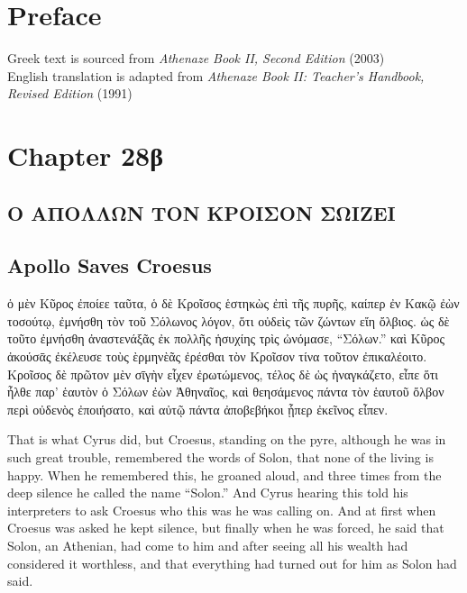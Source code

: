 \documentclass{article}
\begin{document}
\section{Preface}

Greek text is sourced from \emph{Athenaze Book II, Second Edition} (2003) \\
English translation is adapted from \emph{Athenaze Book II: Teacher's Handbook, Revised Edition} (1991)

\section{Chapter 28\textgreek{β}}

\subsection*{\textgreek{Ο ΑΠΟΛΛΩΝ ΤΟΝ ΚΡΟΙΣΟΝ ΣΩΙΖΕΙ}}
\subsection*{Apollo Saves Croesus}

\begin{greek}
ὁ μὲν Κῦρος ἐποίεε ταῦτα, ὁ δὲ Κροῖσος ἑστηκὼς ἐπὶ τῆς πυρῆς,
καίπερ ἐν Κακῷ ἐὼν τοσούτῳ, ἐμνήσθη τὸν τοῦ Σόλωνος λόγον,
ὅτι οὐδεὶς τῶν ζώντων εἴη ὄλβιος.
ὡς δὲ τοῦτο ἐμνήσθη ἀναστενάξᾶς ἐκ πολλῆς ἡσυχίης τρὶς ὠνόμασε, “Σόλων.”
καὶ Κῦρος ἀκούσᾱς ἐκέλευσε τοὺς ὲρμηνὲᾶς ἐρέσθαι τὸν Κροῖσον τίνα τοῦτον ἐπικαλέοιτο.
Κροῖσος δὲ πρῶτον μὲν σῑγὴν εἶχεν ἐρωτώμενος, τέλος δὲ ὡς ἠναγκάζετο,
εἶπε ὅτι ἦλθε παρ’ ἑαυτὸν ὁ Σόλων ἐὼν Ἀθηναῖος,
καὶ θεησάμενος πάντα τὸν ἑαυτοῦ ὄλβον περὶ οὐδενὸς ἐποιήσατο,
καὶ αὐτῷ πάντα ἀποβεβήκοι ᾗπερ ἐκεῖνος εἶπεν. \\
\end{greek}


That is what Cyrus did, but Croesus, standing on the pyre,
although he was in such great trouble, remembered the words of Solon,
that none of the living is happy.
When he remembered this, he groaned aloud,
and three times from the deep silence he called the name ``Solon.''
And Cyrus hearing this told his interpreters to ask Croesus who this was he was calling on.
And at first when Croesus was asked he kept silence,
but finally when he was forced, he said that Solon, an Athenian, had come to him
and after seeing all his wealth had considered it worthless,
and that everything had turned out for him as Solon had said. \\
\end{document}
